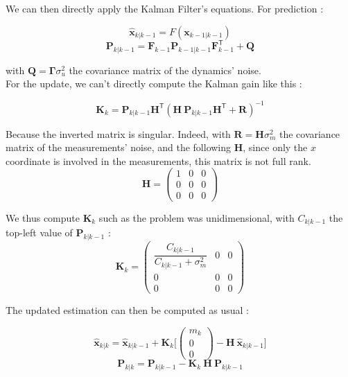 \documentclass[english, DIV=13]{scrartcl}
\renewcommand{\vec}[1]{\mathbf{#1}}
\begin{document}
We can then directly apply the Kalman Filter's equations. For prediction :


\[ \vec{\hat{x}}_{k|k-1} = F(\vec{x}_{k-1|k-1}) \]
\[ \vec{P}_{k|k-1} = \vec{F}_{k-1} \vec{P}_{k-1|k-1} \vec{F}_{k-1}^\mathsf{T} + \vec{Q} \]

with $\vec{Q} = \vec{\Gamma} \sigma_u^2$ the covariance matrix of the dynamics' noise.\\
For the update, we can't directly compute the Kalman gain like this :

\[ \vec{K}_k = \vec{P}_{k|k-1} \vec{H}^\mathsf{T} (\vec{H} ~ \vec{P}_{k|k-1} \vec{H}^\mathsf{T} + \vec{R})^{-1} \]

Because the inverted matrix is singular. Indeed, with $\vec{R} = \vec{H} \sigma_m^2$ the covariance matrix of the measurements' noise, and the following $\vec{H}$, since only the $x$ coordinate is involved in the measurements, this matrix is not full rank.
\begin{equation*}
\vec{H} = 
    \begin{pmatrix}
        1 & 0 & 0 \\
        0 & 0 & 0 \\
        0 & 0 & 0
    \end{pmatrix}
\end{equation*}

We thus compute $\vec{K}_k$ such as the problem was unidimensional, with $C_{k|k-1}$ the top-left value of $\vec{P}_{k|k-1}$ :
\begin{equation*}
\vec{K}_k = 
    \begin{pmatrix}
        \dfrac{C_{k|k-1}}{C_{k|k-1} + \sigma_m^2} & 0 & 0 \\
        0 & 0 & 0 \\
        0 & 0 & 0
    \end{pmatrix}
\end{equation*}

The updated estimation can then be computed as usual :


\[ \vec{\hat{x}}_{k|k} = \vec{\hat{x}}_{k|k-1} + \vec{K}_k \Bigg[ \begin{pmatrix} m_k \\ 0 \\ 0 \end{pmatrix} - \vec{H} ~ \vec{\hat{x}}_{k|k-1} \Bigg] \]
\[ \vec{P}_{k|k} = \vec{P}_{k|k-1} - \vec{K}_k ~ \vec{H} ~ \vec{P}_{k|k-1} \]
\end{document}
